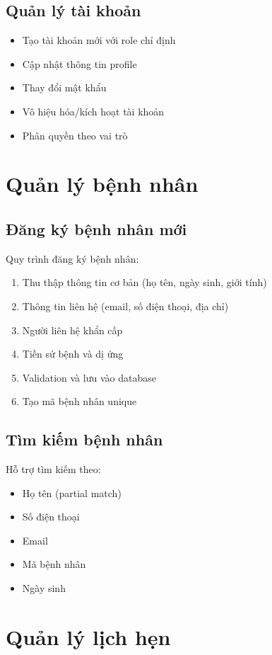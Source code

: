 \documentclass[12pt,a4paper]{report}
\begin{document}
\subsection{Quản lý tài khoản}
\begin{itemize}
    \item Tạo tài khoản mới với role chỉ định
    \item Cập nhật thông tin profile
    \item Thay đổi mật khẩu
    \item Vô hiệu hóa/kích hoạt tài khoản
    \item Phân quyền theo vai trò
\end{itemize}

\section{Quản lý bệnh nhân}

\subsection{Đăng ký bệnh nhân mới}
Quy trình đăng ký bệnh nhân:
\begin{enumerate}
    \item Thu thập thông tin cơ bản (họ tên, ngày sinh, giới tính)
    \item Thông tin liên hệ (email, số điện thoại, địa chỉ)
    \item Người liên hệ khẩn cấp
    \item Tiền sử bệnh và dị ứng
    \item Validation và lưu vào database
    \item Tạo mã bệnh nhân unique
\end{enumerate}

\subsection{Tìm kiếm bệnh nhân}
Hỗ trợ tìm kiếm theo:
\begin{itemize}
    \item Họ tên (partial match)
    \item Số điện thoại
    \item Email
    \item Mã bệnh nhân
    \item Ngày sinh
\end{itemize}

\section{Quản lý lịch hẹn}
\end{document}
